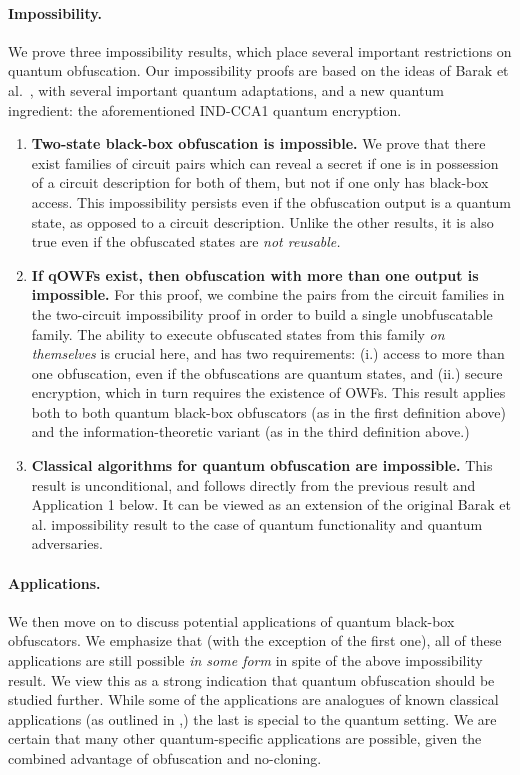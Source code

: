 \documentclass[11pt]{article}
\numberwithin{equation}{section}
\begin{document}
{\paragraph{Impossibility.} We prove three impossibility results, which place several important restrictions on quantum obfuscation. Our impossibility proofs are based on the ideas of Barak et al.~\cite{BGIRSVY12}, with several important quantum adaptations, and a new quantum ingredient: the aforementioned IND-CCA1 quantum encryption.
\begin{enumerate}
\item \textbf{Two-state black-box obfuscation is impossible.} We prove that there exist families of circuit pairs which can reveal a secret if one is in possession of a circuit description for both of them, but not if one only has black-box access. This impossibility persists even if the obfuscation output is a quantum state, as opposed to a circuit description. Unlike the other results, it is also true even if the obfuscated states are \emph{not reusable.}
\item \textbf{If qOWFs exist, then obfuscation with more than one output is impossible.} For this proof, we combine the pairs from the circuit families in the two-circuit impossibility proof in order to build a single unobfuscatable family. The ability to execute obfuscated states from this family \emph{on themselves} is crucial here, and has two requirements: (i.) access to more than one obfuscation, even if the obfuscations are quantum states, and (ii.) secure encryption, which in turn requires the existence of OWFs. This result applies both to both quantum black-box obfuscators (as in the first definition above) and the information-theoretic variant (as in the third definition above.) 
\item \textbf{Classical algorithms for quantum obfuscation are impossible.} This result is unconditional, and follows directly from the previous result and Application 1 below. It can be viewed as an extension of the original Barak et al. impossibility result to the case of quantum functionality and quantum adversaries.
\end{enumerate}

\paragraph{Applications.} We then move on to discuss potential applications of quantum black-box obfuscators. We emphasize that (with the exception of the first one), all of these applications are still possible \emph{in some form} in spite of the above impossibility result. We view this as a strong indication that quantum obfuscation should be studied further. While some of the applications are analogues of known classical applications (as outlined in \cite{BGIRSVY12},) the last is special to the quantum setting. We are certain that many other quantum-specific applications are possible, given the combined advantage of obfuscation and no-cloning.

}
\end{document}
